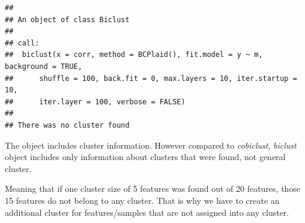 \documentclass[
]{book}
\begin{document}
\begin{verbatim}
## 
## An object of class Biclust 
## 
## call:
##  biclust(x = corr, method = BCPlaid(), fit.model = y ~ m, background = TRUE, 
##      shuffle = 100, back.fit = 0, max.layers = 10, iter.startup = 10, 
##      iter.layer = 100, verbose = FALSE)
## 
## There was no cluster found
\end{verbatim}

The object includes cluster information. However compared to \emph{cobiclust},
\emph{biclust} object includes only information about clusters that were found, not general cluster.

Meaning that if one cluster size of 5 features was found out of 20 features,
those 15 features do not belong to any cluster. That is why we have to create an
additional cluster for features/samples that are not assigned into any cluster.
\end{document}
